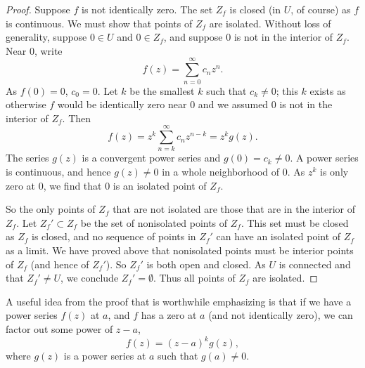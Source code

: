 \documentclass[12pt,openany]{book}
\theoremstyle{plain}
\theoremstyle{remark}
\theoremstyle{definition}
\theoremstyle{exercise}
\theoremstyle{example}
\begin{document}
\begin{proof}
Suppose $f$ is not identically zero.
The set $Z_f$ is closed (in $U$, of course) as $f$ is continuous.  We must show
that points of $Z_f$ are isolated.
Without loss of generality, suppose $0 \in U$ and $0 \in Z_f$,
and suppose $0$ is not in the interior of $Z_f$.
Near $0$, write
\begin{equation*}
f(z) = \sum_{n=0}^\infty c_n z^n .
\end{equation*}
As $f(0) = 0$, $c_0 =0$.  Let $k$ be the smallest $k$ such that $c_k \not=0$;
this $k$ exists as otherwise $f$ would be identically zero near $0$
and we assumed $0$ is not in the interior of $Z_f$.  Then
\begin{equation*}
f(z) = z^k \sum_{n=k}^\infty c_n z^{n-k} = z^k g(z) .
\end{equation*}
The series $g(z)$ is a convergent power series and $g(0) = c_k \not=
0$.  A power series is continuous, and hence $g(z) \not= 0$ in a whole
neighborhood of $0$.
As $z^k$ is only zero at $0$, we find that $0$ is an isolated point of $Z_f$.

So the only points of $Z_f$ that are not isolated are those that are in the
interior of $Z_f$.  Let $Z_f' \subset Z_f$ be the set of nonisolated points
of $Z_f$.  This set must be closed as $Z_f$ is closed, and no sequence
of points in $Z_f'$ can
have an isolated point of $Z_f$ as a limit.
We have proved above that nonisolated
points must be interior points of $Z_f$ (and hence of $Z_f'$).
So $Z_f'$ is both open and closed.  As $U$ is connected and 
that $Z_f' \not= U$, we conclude $Z_f' = \emptyset$.
Thus all points of $Z_f$ are isolated.
\end{proof}

A useful idea from the proof that is worthwhile emphasizing
is that if we have a power series $f(z)$ at $a$,
and $f$ has a zero at $a$ (and not identically zero),
we can factor out some power of $z-a$,
\begin{equation*}
f(z) = {(z-a)}^k g(z) ,
\end{equation*}
where $g(z)$ is a power series at $a$ such that $g(a) \not= 0$.
\end{document}
